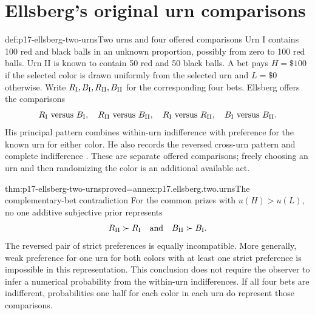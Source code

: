 \section{Ellsberg's original urn comparisons}

\begin{hbdefinition}{def:p17-ellsberg-two-urns}{Two urns and four offered comparisons}
Urn I contains 100 red and black balls in an unknown proportion,
possibly from zero to 100 red balls. Urn II is known to contain
50 red and 50 black balls. A bet pays \(H=\$100\) if the
selected color is drawn uniformly from the selected urn and
\(L=\$0\) otherwise. Write \(R_{\rm I},B_{\rm I},
R_{\rm II},B_{\rm II}\) for the corresponding four bets.
Ellsberg offers the comparisons
\[
 R_{\rm I}\ \hbox{versus}\ B_{\rm I},\quad
 R_{\rm II}\ \hbox{versus}\ B_{\rm II},\quad
 R_{\rm I}\ \hbox{versus}\ R_{\rm II},\quad
 B_{\rm I}\ \hbox{versus}\ B_{\rm II}.
\]
His principal pattern combines within-urn indifference with
preference for the known urn for either color. He also records
the reversed cross-urn pattern and complete indifference
\cite[pp.~650--653]{Ellsberg1961Ambiguity}.
These are separate offered comparisons; freely choosing an urn
and then randomizing the color is an additional available act.
\end{hbdefinition}

\begin{hbtheorem}{thm:p17-ellsberg-two-urns}{proved=annex:p17.ellsberg.two.urns}{The complementary-bet contradiction}
For the common prizes with \(u(H)>u(L)\), no one additive
subjective prior represents
\[
 R_{\rm II}\succ R_{\rm I}
                    \quad\hbox{and}\quad
 B_{\rm II}\succ B_{\rm I}.
\]
The reversed pair of strict preferences is equally incompatible.
More generally, weak preference for one urn for both colors
with at least one strict preference is impossible in this
representation. This conclusion does not require the observer
to infer a numerical probability from the within-urn indifferences.
If all four bets are indifferent, probabilities one half for
each color in each urn do represent those comparisons.
\end{hbtheorem}

